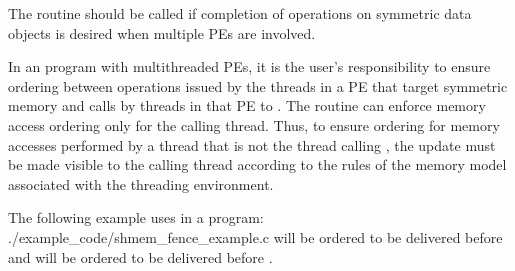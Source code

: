 \begin{apidefinition}
{    The  routine should be called if completion of operations
    on symmetric data objects is desired
    when multiple \acp{PE} are involved.

    In an \openshmem program with multithreaded \acp{PE}, it is the
    user's responsibility to ensure ordering between operations issued by the threads
    in a \ac{PE} that target symmetric memory and calls by threads in that \ac{PE} to
    . The  routine can enforce memory access ordering only for the
    calling thread. Thus, to ensure ordering for memory accesses performed by a thread that is
    not the thread calling , the update must be made visible to the
    calling thread according to the rules of the memory model associated with
    the threading environment.
}

\begin{apiexamples}

\apicexample
    {The following example uses  in a \Cstd[11] program: }
    {./example_code/shmem_fence_example.c}
    { will be ordered to be delivered before  and 
    will be ordered to be delivered before .}

\end{apiexamples}

\end{apidefinition}

